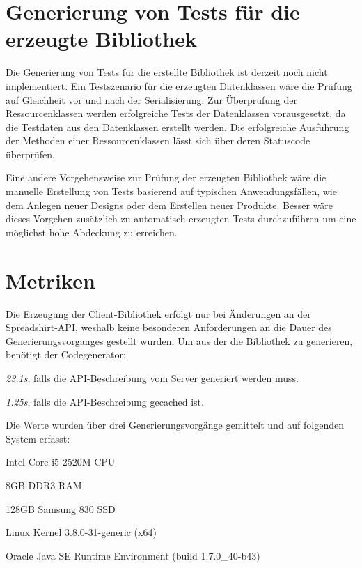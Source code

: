 \section{Generierung von Tests für die erzeugte Bibliothek}
\label{sec:test_coverage}

Die Generierung von Tests für die erstellte Bibliothek ist derzeit noch nicht implementiert. Ein Testszenario für die erzeugten Datenklassen wäre die Prüfung auf Gleichheit vor und nach der Serialisierung. Zur Überprüfung der Ressourcenklassen werden erfolgreiche Tests der Datenklassen vorausgesetzt, da die Testdaten aus den Datenklassen erstellt werden. Die erfolgreiche Ausführung der Methoden einer Ressourcenklassen lässt sich über deren Statuscode überprüfen.

Eine andere Vorgehensweise zur Prüfung der erzeugten Bibliothek wäre die manuelle Erstellung von Tests basierend auf typischen Anwendungsfällen, wie dem Anlegen neuer Designs oder dem Erstellen neuer Produkte. Besser wäre dieses Vorgehen zusätzlich zu automatisch erzeugten Tests durchzuführen um eine möglichst hohe Abdeckung zu erreichen.

\section{Metriken}
\label{sec:codemetrics}

Die Erzeugung der Client-Bibliothek erfolgt nur bei Änderungen an der Spreadshirt-\gls{API}, weshalb keine besonderen Anforderungen an die Dauer des Generierungsvorganges gestellt wurden. Um aus der  \cite{WADL} die Bibliothek zu generieren, benötigt der Codegenerator:
\begin{compactitem}
  \item \emph{23.1s}, falls die \gls{API}-Beschreibung vom Server generiert werden muss.
  \item \emph{1.25s}, falls die \gls{API}-Beschreibung gecached ist. 
\end{compactitem}

Die Werte wurden über drei Generierungsvorgänge gemittelt und auf folgenden System erfasst:
\begin{compactitem}
  \item Intel\textsuperscript{\textregistered{}} Core\texttrademark{} i5-2520M CPU
  \item 8GB DDR3 RAM
  \item 128GB Samsung\textsuperscript{\textregistered{}} 830 SSD
  \item Linux Kernel 3.8.0-31-generic (x64)
  \item Oracle\textsuperscript{\textregistered{}} Java\texttrademark{} SE Runtime Environment (build 1.7.0\_40-b43)
\end{compactitem}

